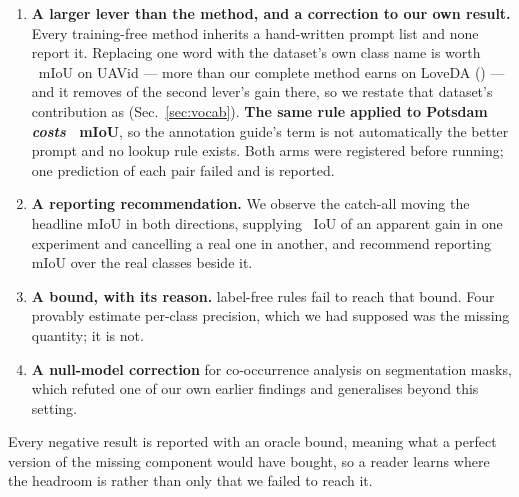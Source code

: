 \documentclass[10pt,a4paper]{article}                        %
\newcommand{\best}[1]{\textbf{#1}}
\begin{document}
\begin{enumerate}
        completeness result above holds only \emph{given} the argmax, we fit a
        per-class scale \emph{before} it (Sec.~\ref{sec:scale}). It adds
        \scPots{}~$\pm$~\scPotsSD{}~mIoU on Potsdam, \scLove{}~$\pm$~\scLoveSD{}
        on LoveDA and \uavScaleCV{}~$\pm$~\uavScaleSD{} on UAVid over thresholds
        alone, all verified end to end, and \scCI{} on the CLIP pipeline. \best{We pre-registered a positive result there and were
        wrong}; the mechanism we proposed is withdrawn in Sec.~\ref{sec:scaleresults}.
  \item \textbf{\best{A larger lever than the method, and a correction to our own
        result.}} Every training-free method inherits a hand-written prompt list and
        none report it. Replacing one word with the dataset's own class name is worth
        \vocUavGain{}~mIoU on UAVid --- more than our complete method earns on
        LoveDA (\loveTotal{}) --- and it removes \uavScaleLost{} of the second
        lever's gain there, so we restate that dataset's contribution as
        \uavCorrMethod{} (Sec.~\ref{sec:vocab}). \best{The same rule applied to
        Potsdam \emph{costs} \vocPotsGain{}~mIoU}, so the annotation guide's term is
        not automatically the better prompt and no lookup rule exists. Both arms were
        registered before running; one prediction of each pair failed and is reported.
  \item \textbf{A reporting recommendation.} We observe the catch-all moving the
        headline mIoU in both directions, supplying \oemBgGain{}~IoU of an
        apparent gain in one experiment and cancelling a real one in another, and
        recommend reporting mIoU over the real classes beside it.
  \item \textbf{A bound, with its reason.} \nAttempts{} label-free rules fail to
        reach that bound. Four provably estimate per-class precision, which we had
        supposed was the missing quantity; it is not.
  \item \textbf{A null-model correction} for co-occurrence analysis on segmentation
        masks, which refuted one of our own earlier findings and generalises beyond
        this setting.
\end{enumerate}

Every negative result is reported with an oracle bound, meaning what a perfect
version of the missing component would have bought, so a reader learns where the
headroom is rather than only that we failed to reach it.

\end{document}
